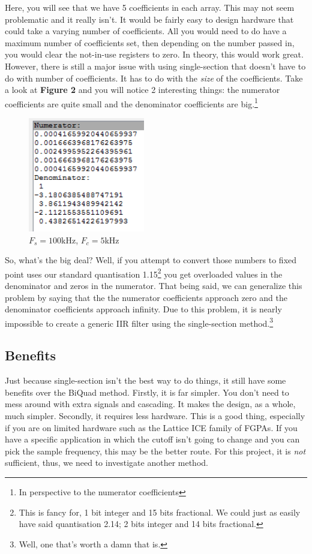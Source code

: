 \documentclass[12pt,a4paper,titlepage]{article}
\begin{document}
Here, you will see that we have 5 coefficients in each array. This may not seem
problematic and it really isn't. It would be fairly easy to design hardware that
could take a varying number of coefficients. All you would need to do have a
maximum number of coefficients set, then depending on the number passed in, you
would clear the not-in-use registers to zero. In theory, this would work
great. However, there is still a major issue with using single-section that
doesn't have to do with number of coefficients. It has to do with the
\emph{size} of the coefficients. Take a look at \textbf{Figure 2} and you will
notice 2 interesting things: the numerator coefficients are quite small and the
denominator coefficients are big.\footnote{In perspective to the numerator
  coefficients}

\begin{figure}[!htb]
  \centering
  \includegraphics[height=5cm]
                  {../presentation/standard-coeffs-100kfs-5kfc.png}
                  \caption{$F_s = 100$kHz, $F_c = 5$kHz}
\end{figure}

So, what's the big deal? Well, if you attempt to convert those numbers to fixed
point uses our standard quantisation 1.15\footnote{This is fancy for, 1 bit
  integer and 15 bits fractional. We could just as easily have said quantisation
  2.14; 2 bits integer and 14 bits fractional.} you get overloaded values in the
denominator and zeros in the numerator. That being said, we can generalize this
problem by saying that the the numerator coefficients approach zero and the
denominator coefficients approach infinity. Due to this problem, it is nearly
impossible to create a generic IIR filter using the single-section
method.\footnote{Well, one that's worth a damn that is.}

\subsection{Benefits}
Just because single-section isn't the best way to do things, it still have some
benefits over the BiQuad method. Firstly, it is far simpler. You don't need to
mess around with extra signals and cascading. It makes the design, as a whole,
much simpler. Secondly, it requires less hardware. This is a good thing,
especially if you are on limited hardware such as the Lattice ICE family of
FGPAs. If you have a specific application in which the cutoff isn't going to
change and you can pick the sample frequency, this may be the better
route. For this project, it is \emph{not} sufficient, thus, we need to
investigate another method.
\end{document}
